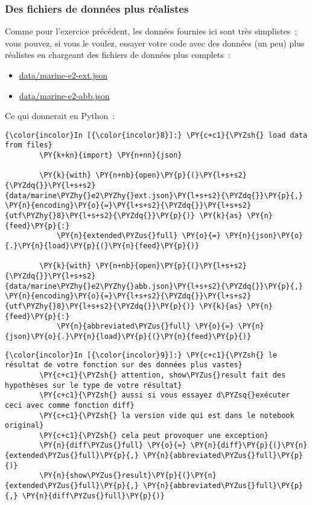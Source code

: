     \hypertarget{des-fichiers-de-donnuxe9es-plus-ruxe9alistes}{%
\subsubsection{Des fichiers de données plus
réalistes}\label{des-fichiers-de-donnuxe9es-plus-ruxe9alistes}}

    Comme pour l'exercice précédent, les données fournies ici sont très
simplistes~; vous pouvez, si vous le voulez, essayer votre code avec des
données (un peu) plus réalistes en chargeant des fichiers de données
plus complets~:

\begin{itemize}
\tightlist
\item
  \url{data/marine-e2-ext.json}
\item
  \url{data/marine-e2-abb.json}
\end{itemize}

Ce qui donnerait en Python~:

    \begin{Verbatim}[commandchars=\\\{\},frame=single,framerule=0.3mm,rulecolor=\color{cellframecolor}]
{\color{incolor}In [{\color{incolor}8}]:} \PY{c+c1}{\PYZsh{} load data from files}
        \PY{k+kn}{import} \PY{n+nn}{json}
        
        \PY{k}{with} \PY{n+nb}{open}\PY{p}{(}\PY{l+s+s2}{\PYZdq{}}\PY{l+s+s2}{data/marine\PYZhy{}e2\PYZhy{}ext.json}\PY{l+s+s2}{\PYZdq{}}\PY{p}{,} \PY{n}{encoding}\PY{o}{=}\PY{l+s+s2}{\PYZdq{}}\PY{l+s+s2}{utf\PYZhy{}8}\PY{l+s+s2}{\PYZdq{}}\PY{p}{)} \PY{k}{as} \PY{n}{feed}\PY{p}{:}
            \PY{n}{extended\PYZus{}full} \PY{o}{=} \PY{n}{json}\PY{o}{.}\PY{n}{load}\PY{p}{(}\PY{n}{feed}\PY{p}{)}
        
        \PY{k}{with} \PY{n+nb}{open}\PY{p}{(}\PY{l+s+s2}{\PYZdq{}}\PY{l+s+s2}{data/marine\PYZhy{}e2\PYZhy{}abb.json}\PY{l+s+s2}{\PYZdq{}}\PY{p}{,} \PY{n}{encoding}\PY{o}{=}\PY{l+s+s2}{\PYZdq{}}\PY{l+s+s2}{utf\PYZhy{}8}\PY{l+s+s2}{\PYZdq{}}\PY{p}{)} \PY{k}{as} \PY{n}{feed}\PY{p}{:}
            \PY{n}{abbreviated\PYZus{}full} \PY{o}{=} \PY{n}{json}\PY{o}{.}\PY{n}{load}\PY{p}{(}\PY{n}{feed}\PY{p}{)}
\end{Verbatim}


    \begin{Verbatim}[commandchars=\\\{\},frame=single,framerule=0.3mm,rulecolor=\color{cellframecolor}]
{\color{incolor}In [{\color{incolor}9}]:} \PY{c+c1}{\PYZsh{} le résultat de votre fonction sur des données plus vastes}
        \PY{c+c1}{\PYZsh{} attention, show\PYZus{}result fait des hypothèses sur le type de votre résultat}
        \PY{c+c1}{\PYZsh{} aussi si vous essayez d\PYZsq{}exécuter ceci avec comme fonction diff}
        \PY{c+c1}{\PYZsh{} la version vide qui est dans le notebook original}
        \PY{c+c1}{\PYZsh{} cela peut provoquer une exception}
        \PY{n}{diff\PYZus{}full} \PY{o}{=} \PY{n}{diff}\PY{p}{(}\PY{n}{extended\PYZus{}full}\PY{p}{,} \PY{n}{abbreviated\PYZus{}full}\PY{p}{)}
        \PY{n}{show\PYZus{}result}\PY{p}{(}\PY{n}{extended\PYZus{}full}\PY{p}{,} \PY{n}{abbreviated\PYZus{}full}\PY{p}{,} \PY{n}{diff\PYZus{}full}\PY{p}{)}
\end{Verbatim}


